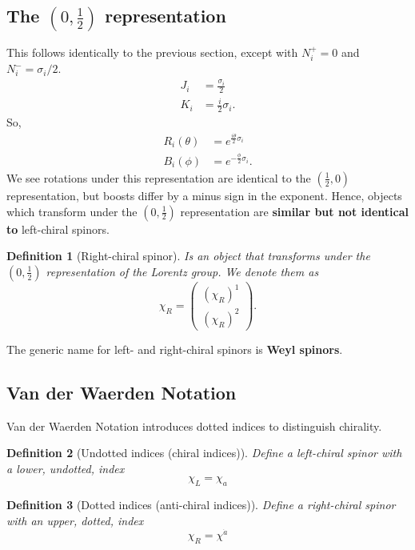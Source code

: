 \documentclass[11pt]{article}
\numberwithin{equation}{section}
\newtheorem{defn}{Definition}[section]
\begin{document}
\subsection{The $(0, \frac{1}{2})$ representation}
This follows identically to the previous section, except with $N_i^+=0$ and $N_i^- = \sigma_i/2$. 
\begin{align}
J_i &= \frac{\sigma_i}{2} \\
K_i &= \frac{i}{2} \sigma_i.
\end{align}
So,
\begin{align}
R_i(\theta) &= e^{\frac{i \theta}{2}  \sigma_i} \\
B_i(\phi) &= e^{-\frac{\phi}{2}  \sigma_i}.
\end{align}
We see rotations under this representation are identical to the $(\frac{1}{2},0)$ representation, but boosts differ by a minus sign in the exponent. Hence, objects which transform under the $(0, \frac{1}{2})$ representation are \textbf{similar but not identical to} left-chiral spinors.
\begin{defn}[Right-chiral spinor]
Is an object that transforms under the $(0, \frac{1}{2})$ representation of the Lorentz group. We denote them as 
\begin{equation}
\chi_R = \begin{pmatrix}
(\chi_R)^1 \\
(\chi_R)^2 
\end{pmatrix}.
\end{equation}
\end{defn}
\noindent The generic name for left- and right-chiral spinors is \textbf{Weyl spinors}.

\subsection{Van der Waerden Notation}

Van der Waerden Notation introduces dotted indices to distinguish chirality.

\begin{defn}[Undotted indices (chiral indices)]
Define a left-chiral spinor with a lower, undotted, index
\begin{equation}
\chi_L = \chi_a
\end{equation}
\end{defn}

\begin{defn}[Dotted indices (anti-chiral indices)]
Define a right-chiral spinor with an upper, dotted, index
\begin{equation}
\chi_R = \chi^{\dot{a}}
\end{equation}
\end{defn}
\end{document}
